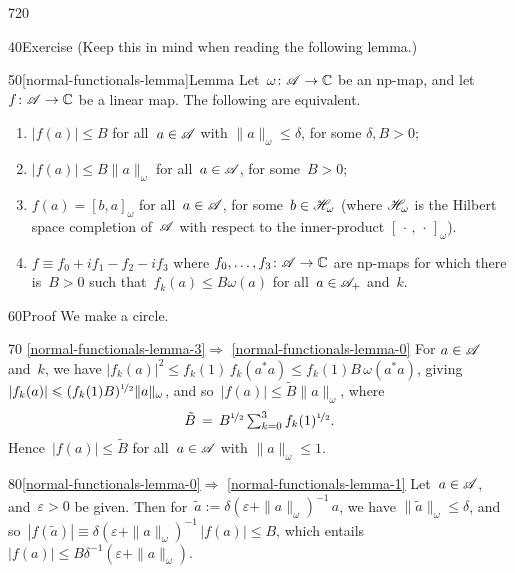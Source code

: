 \begin{parsec}{720}
\begin{point}{40}{Exercise}
(Keep this in mind when reading the following lemma.)
\end{point}
\begin{point}{50}[normal-functionals-lemma]{Lemma}%
Let~$\omega\colon \scrA\to\C$ be an np-map,
and let~$f\colon \scrA\to \C$ be a linear map.
The following are equivalent.
\begin{enumerate}
\item\label{normal-functionals-lemma-0}
$\left|f(a)\right|\leq B$ for all~$a\in \scrA$
with $\|a\|_\omega\leq \delta$, for some $\delta,B>0$;
\item\label{normal-functionals-lemma-1}
$\left|f(a)\right| \leq B \|a\|_\omega$ for all~$a\in\scrA$,
for some~$B>0$;
\item\label{normal-functionals-lemma-2}
$f(a)=[b,a]_\omega$ for all~$a\in\scrA$, 
for some~$b\in\scrH_\omega$
(where $\scrH_\omega$ is the Hilbert space completion of~$\scrA$
with respect to the inner-product
$[\,\cdot\,,\,\cdot\,]_\omega$).
\item\label{normal-functionals-lemma-3}
$f\equiv f_0+if_1-f_2-if_3$
where $f_0,\dotsc,f_3\colon \scrA\to \C$
are np-maps for which there is~$B>0$
such that~$f_k(a)\leq B \omega(a)$ for all~$a\in\pos{\scrA}$ 
and~$k$. 
\end{enumerate}
\begin{point}{60}{Proof}%
We make a circle.
\begin{point}{70}{%
\ref{normal-functionals-lemma-3}$\Longrightarrow$%
\ref{normal-functionals-lemma-0}}%
For $a\in \scrA$ and~$k$, we have
$\left|f_k(a)\right|^2 \leq
f_k(1)\,f_k(a^*a) \leq f_k(1)B \,\omega(a^*a)$,
giving~$\left|f_k(a)\right| \leq (f_k(1)B)^{\nicefrac{1}{2}} \|a\|_\omega$,
and so~$\left|f(a)\right|\leq \tilde{B} \|a\|_\omega$,
where 
\begin{equation*}
	\textstyle
	\tilde{B} \,=\, B^{\nicefrac{1}{2}}\sum_{k=0}^3f_k(1)^{\nicefrac{1}{2}}.
\end{equation*}
Hence~$\left|f(a)\right|\leq \tilde{B}$
for all~$a\in\scrA$ with $\|a\|_\omega\leq 1$.
\end{point}
\begin{point}{80}{\ref{normal-functionals-lemma-0}$\Longrightarrow$%
\ref{normal-functionals-lemma-1}}%
Let~$a\in\scrA$, and~$\varepsilon>0$ be given.
Then for~$\tilde{a}:=\delta(\varepsilon+\|a\|_\omega)^{-1}\,a$,
we have $\|\tilde{a}\|_\omega\leq \delta$,
and so~$\left|f(\tilde{a})\right|
\equiv \delta(\varepsilon +\|a\|_\omega)^{-1} \,\left|f(a)\right|
\leq B$,
which entails $\left|f(a)\right|\leq 
B\delta^{-1}(\varepsilon+\|a\|_\omega)$.

\end{point}
\end{point}
\end{point}
\end{parsec}
